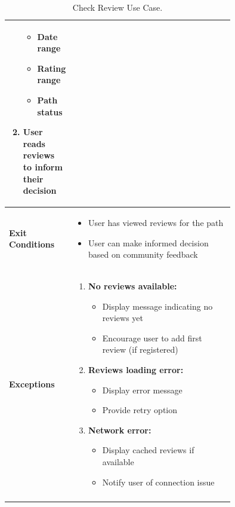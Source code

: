 \begin{center}
\begin{longtable}{|l|p{0.75\linewidth}|}
\begin{enumerate}
            \begin{itemize}
                \item Date range
                \item Rating range
                \item Path status
            \end{itemize}
            \item User reads reviews to inform their decision
        \end{enumerate} \\
        \hline
        \textbf{Exit Conditions}   & 
        \begin{itemize}
            \item User has viewed reviews for the path
            \item User can make informed decision based on community feedback
        \end{itemize} \\
        \hline
        \textbf{Exceptions}       & 
        \begin{enumerate}
            \item \textbf{No reviews available:}
            \begin{itemize}
                \item Display message indicating no reviews yet
                \item Encourage user to add first review (if registered)
            \end{itemize}
            \item \textbf{Reviews loading error:}
            \begin{itemize}
                \item Display error message
                \item Provide retry option
            \end{itemize}
            \item \textbf{Network error:}
            \begin{itemize}
                \item Display cached reviews if available
                \item Notify user of connection issue
            \end{itemize}
        \end{enumerate} \\
        \hline
        \caption{Check Review Use Case.}
        \label{tab:check_review_use_case}
    \end{longtable}
\end{center}

